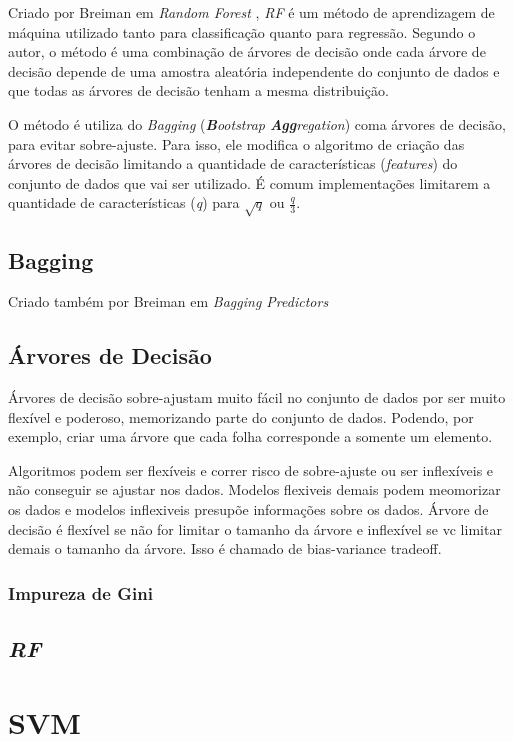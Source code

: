 
Criado por Breiman em \textit{Random Forest} \cite{Breiman:2001:RF:570181.570182}, \textit{\acrshort{RF}} é um método de aprendizagem de máquina utilizado tanto para classificação quanto para regressão. Segundo o autor, o método é uma combinação de árvores de decisão onde cada árvore de decisão depende de uma amostra aleatória independente do conjunto de dados e que todas as árvores de decisão tenham a mesma distribuição.

O método é utiliza do \textit{Bagging} (\textit{\textbf{B}ootstrap \textbf{Agg}regation}) coma árvores de decisão, para evitar sobre-ajuste. Para isso, ele modifica o algoritmo de criação das árvores de decisão limitando a quantidade de características (\textit{features}) do conjunto de dados que vai ser utilizado. É comum implementações limitarem a quantidade de características (\textit{q}) para $ \sqrt{q} $ ou $ \frac{q}{3} $.

\subsection{Bagging}

Criado também por Breiman em \textit{Bagging Predictors} \cite{}


\subsection{Árvores de Decisão}

 Árvores de decisão sobre-ajustam muito fácil no conjunto de dados por ser muito flexível e poderoso, memorizando parte do conjunto de dados. Podendo, por exemplo, criar uma árvore que cada folha corresponde a somente um elemento.

 Algoritmos podem ser flexíveis e correr risco de sobre-ajuste ou ser inflexíveis e não conseguir se ajustar nos dados. Modelos flexiveis demais podem  meomorizar os dados e modelos inflexiveis presupõe informações sobre os dados.
 Árvore de decisão é flexível se não for limitar o tamanho da árvore e inflexível se vc limitar demais o tamanho da árvore. Isso é chamado de bias-variance tradeoff.

\subsubsection{Impureza de Gini}

\subsection{\textit{\acrshort{RF}}}


\section{\acrfull{SVM}}


